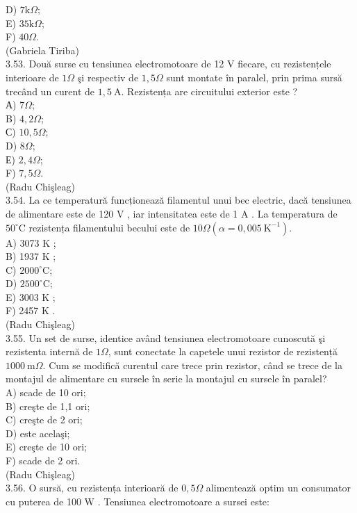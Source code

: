 \documentclass[10pt]{article}
\begin{document}
D) $7 \mathrm{k} \Omega$;\\
E) $35 \mathrm{k} \Omega$;\\
F) $40 \Omega$.\\
(Gabriela Tiriba)\\
3.53. Două surse cu tensiunea electromotoare de 12 V fiecare, cu rezistențele interioare de $1 \Omega$ şi respectiv de $1,5 \Omega$ sunt montate în paralel, prin prima sursă trecând un curent de $1,5 \mathrm{~A}$. Rezistența are circuitului exterior este ?\\
А) $7 \Omega$;\\
B) $4,2 \Omega$;\\
С) $10,5 \Omega$;\\
D) $8 \Omega$;\\
Е) $2,4 \Omega$;\\
F) $7,5 \Omega$.\\
(Radu Chişleag)\\
3.54. La ce temperatură funcționează filamentul unui bec electric, dacă tensiunea de alimentare este de 120 V , iar intensitatea este de 1 A . La temperatura de $50^{\circ} \mathrm{C}$ rezistența filamentului becului este de $10 \Omega\left(\alpha=0,005 \mathrm{~K}^{-1}\right)$.\\
A) 3073 K ;\\
B) 1937 K ;\\
C) $2000^{\circ} \mathrm{C}$;\\
D) $2500^{\circ} \mathrm{C}$;\\
E) 3003 K ;\\
F) 2457 K .\\
(Radu Chişleag)\\
3.55. Un set de surse, identice având tensiunea electromotoare cunoscută şi rezistenta internă de $1 \Omega$, sunt conectate la capetele unui rezistor de rezistență $1000 \mathrm{~m} \Omega$. Cum se modifică curentul care trece prin rezistor, când se trece de la montajul de alimentare cu sursele în serie la montajul cu sursele în paralel?\\
A) scade de 10 ori;\\
B) creşte de 1,1 ori;\\
C) creşte de 2 ori;\\
D) este acelaşi;\\
E) creşte de 10 ori;\\
F) scade de 2 ori.\\
(Radu Chişleag)\\
3.56. O sursă, cu rezistența interioară de $0,5 \Omega$ alimentează optim un consumator cu puterea de 100 W . Tensiunea electromotoare a sursei este:\\
\end{document}

